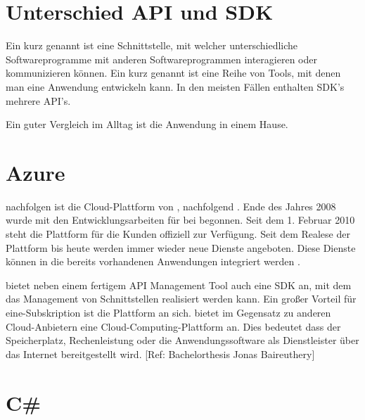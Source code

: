 \section{Unterschied API und SDK}\label{sec:2_API/SDK}

Ein  kurz  genannt ist eine Schnittstelle, mit welcher unterschiedliche Softwareprogramme mit anderen Softwareprogrammen interagieren oder kommunizieren können. Ein  kurz  genannt ist eine Reihe von Tools, mit denen man eine Anwendung entwickeln kann. In den meisten Fällen enthalten SDK's mehrere API's.

Ein guter Vergleich im Alltag ist die Anwendung in einem Hause.
\par
\begingroup
\leftskip=1cm
\rightskip=1cm
\par
\endgroup

\section{Azure}\label{sec:2_Azure}	

 nachfolgen  ist die Cloud-Plattform von , nachfolgend . Ende des Jahres 2008 wurde mit den Entwicklungsarbeiten für  bei  begonnen. Seit dem 1. Februar 2010 steht die Plattform für die Kunden offiziell zur Verfügung. Seit dem Realese der Plattform bis heute werden immer wieder neue Dienste angeboten. Diese Dienste können in die bereits vorhandenen Anwendungen integriert werden \cite{Wikipedia.21.10.2018}.

 bietet neben einem fertigem API Management Tool auch eine SDK an, mit dem das Management von Schnittstellen realisiert werden kann. Ein großer Vorteil für eine-Subskription ist die Plattform an sich.  bietet im Gegensatz zu anderen Cloud-Anbietern eine Cloud-Computing-Plattform an. Dies bedeutet dass der Speicherplatz, Rechenleistung oder die Anwendungssoftware als Dienstleister über das Internet bereitgestellt wird. [Ref: Bachelorthesis Jonas Baireuthery]

\section{C\#}\label{sec:2_C}



